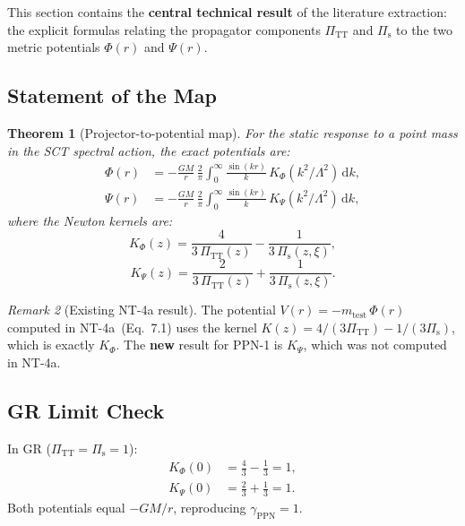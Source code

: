 \documentclass[11pt,a4paper]{article}
\theoremstyle{plain}
\newtheorem{theorem}{Theorem}[section]
\theoremstyle{definition}
\theoremstyle{remark}
\newtheorem{remark}[theorem]{Remark}
\renewcommand{\dd}{\mathrm{d}}
\begin{document}
This section contains the \textbf{central technical result} of the
literature extraction: the explicit formulas relating the propagator
components $\Pi_{\mathrm{TT}}$ and $\Pi_{\mathrm{s}}$ to the two
metric potentials $\Phi(r)$ and $\Psi(r)$.

\subsection{Statement of the Map}

\begin{theorem}[Projector-to-potential map]\label{thm:proj-pot}
For the static response to a point mass in the SCT spectral action,
the exact potentials are:
\begin{align}
  \Phi(r) &= -\frac{GM}{r}\,\frac{2}{\pi}
  \int_0^\infty \frac{\sin(kr)}{k}\, K_\Phi(k^2/\Lambda^2)\,\dd k,
  \label{eq:Phi-exact}\\
  \Psi(r) &= -\frac{GM}{r}\,\frac{2}{\pi}
  \int_0^\infty \frac{\sin(kr)}{k}\, K_\Psi(k^2/\Lambda^2)\,\dd k,
  \label{eq:Psi-exact}
\end{align}
where the \emph{Newton kernels} are:
\begin{equation}\label{eq:K-Phi}
  \boxed{K_\Phi(z) = \frac{4}{3\,\Pi_{\mathrm{TT}}(z)}
  - \frac{1}{3\,\Pi_{\mathrm{s}}(z,\xi)},}
\end{equation}
\begin{equation}\label{eq:K-Psi}
  \boxed{K_\Psi(z) = \frac{2}{3\,\Pi_{\mathrm{TT}}(z)}
  + \frac{1}{3\,\Pi_{\mathrm{s}}(z,\xi)}.}
\end{equation}
\end{theorem}

\begin{remark}[Existing NT-4a result]
The potential $V(r) = -m_{\mathrm{test}}\,\Phi(r)$ computed in
NT-4a~(Eq.~7.1) uses the kernel $K(z) = 4/(3\Pi_{\mathrm{TT}})
- 1/(3\Pi_{\mathrm{s}})$, which is exactly $K_\Phi$.
The \textbf{new} result for PPN-1 is $K_\Psi$, which was not
computed in NT-4a.
\end{remark}

\subsection{GR Limit Check}

In GR ($\Pi_{\mathrm{TT}} = \Pi_{\mathrm{s}} = 1$):
\begin{align}
  K_\Phi(0) &= \frac{4}{3} - \frac{1}{3} = 1,\\
  K_\Psi(0) &= \frac{2}{3} + \frac{1}{3} = 1.
\end{align}
Both potentials equal $-GM/r$, reproducing $\gamma_{\mathrm{PPN}} = 1$.
\end{document}
